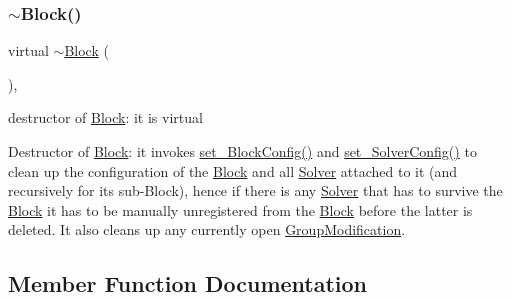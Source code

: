 \subsubsection{\texorpdfstring{$\sim$\+Block()}{~Block()}}
{\footnotesize\ttfamily virtual $\sim$\mbox{\hyperlink{class_s_m_spp__di__unipi__it_1_1_block}{Block}} (\begin{DoxyParamCaption}{ }\end{DoxyParamCaption})\hspace{0.3cm}{\ttfamily [inline]}, {\ttfamily [virtual]}}



destructor of \mbox{\hyperlink{class_s_m_spp__di__unipi__it_1_1_block}{Block}}\+: it is virtual 

Destructor of \mbox{\hyperlink{class_s_m_spp__di__unipi__it_1_1_block}{Block}}\+: it invokes \mbox{\hyperlink{class_s_m_spp__di__unipi__it_1_1_block_a18d411b740a47db00d15083c5c7ef2ba}{set\+\_\+\+Block\+Config()}} and \mbox{\hyperlink{class_s_m_spp__di__unipi__it_1_1_block_a40a2bbe11fbdf470e474f6638fefa66f}{set\+\_\+\+Solver\+Config()}} to clean up the configuration of the \mbox{\hyperlink{class_s_m_spp__di__unipi__it_1_1_block}{Block}} and all \mbox{\hyperlink{class_s_m_spp__di__unipi__it_1_1_solver}{Solver}} attached to it (and recursively for its sub-\/\+Block), hence if there is any \mbox{\hyperlink{class_s_m_spp__di__unipi__it_1_1_solver}{Solver}} that has to survive the \mbox{\hyperlink{class_s_m_spp__di__unipi__it_1_1_block}{Block}} it has to be manually unregistered from the \mbox{\hyperlink{class_s_m_spp__di__unipi__it_1_1_block}{Block}} before the latter is deleted. It also cleans up any currently open \mbox{\hyperlink{class_s_m_spp__di__unipi__it_1_1_group_modification}{Group\+Modification}}. 

\subsection{Member Function Documentation}
\mbox{\label{class_s_m_spp__di__unipi__it_1_1_block_ac62b923907f97affc9460832240072fb}} 
